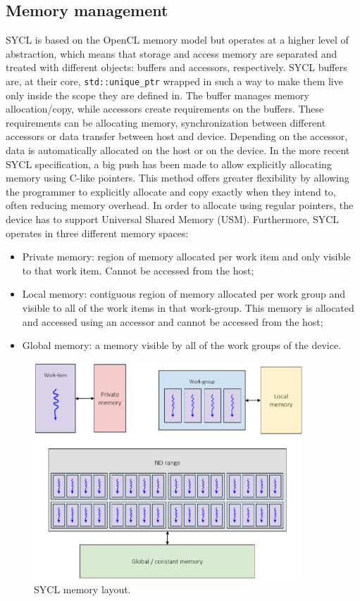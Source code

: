 \subsection{Memory management}
\label{ch:memory_management}
SYCL is based on the OpenCL memory model but operates at a higher level of abstraction, which means that storage and access memory are separated and treated with different objects: buffers and accessors, respectively. SYCL buffers are, at their core, \texttt{std::unique\_ptr} wrapped in such a way to make them live only inside the scope they are defined in. The buffer manages memory allocation/copy, while accessors create requirements on the buffers. These requirements can be allocating memory, synchronization between different accessors or data transfer between host and device. Depending on the accessor, data is automatically allocated on the host or on the device. In the more recent SYCL specification, a big push has been made to allow explicitly allocating memory using C-like pointers. This method offers greater flexibility by allowing the programmer to explicitly allocate and copy exactly when they intend to, often reducing memory overhead. In order to allocate using regular pointers, the device has to support Universal Shared Memory (USM). Furthermore, SYCL operates in three different memory spaces: 
\begin{itemize}
    \item Private memory: region of memory allocated per work item and only visible to that work item. Cannot be accessed from the host;
    \item Local memory: contiguous region of memory allocated per work group and visible to all of the work items in that work-group. This memory is allocated and accessed using an accessor and cannot be accessed from the host;
    \item Global memory: a memory visible by all of the work groups of the device.
\end{itemize}

\begin{figure}[H]
\centering
\includegraphics[width=0.9\textwidth]{media/sycl_memory_layout.png}
\caption{SYCL memory layout.}
\label{fig:nd-range-mem}
\end{figure}

